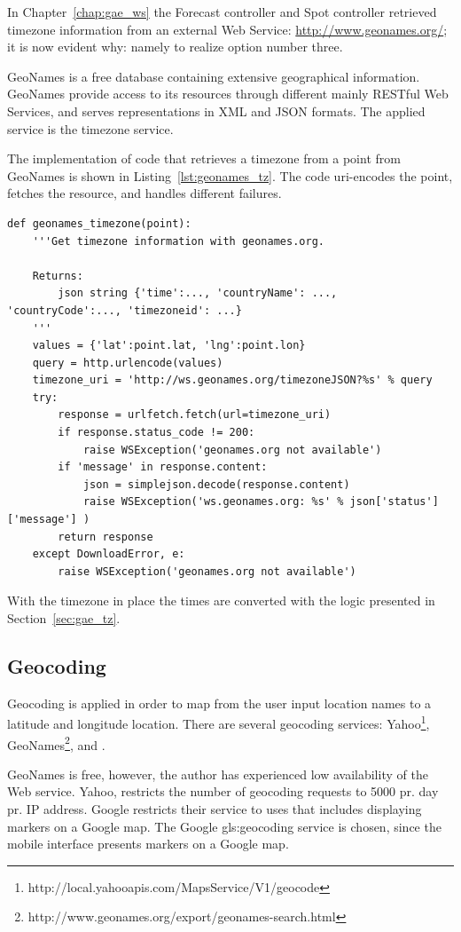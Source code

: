 In Chapter~\ref{chap:gae_ws} the Forecast controller and Spot controller
retrieved timezone information from an external Web Service:
\url{http://www.geonames.org/}; it is now evident why: namely to realize option
number three. 

GeoNames is a free database containing extensive geographical
information. GeoNames provide access to its resources through different mainly
RESTful Web Services, and serves representations in XML and JSON formats. The
applied service is the timezone service.

The implementation of code that retrieves a timezone from a point from GeoNames
is shown in Listing~\ref{lst:geonames_tz}. The code uri-encodes the point, fetches
the resource, and handles different failures.

\begin{lstlisting}[caption=Using GeoNames timezone Web Service, label=lst:geonames_tz]
def geonames_timezone(point):
    '''Get timezone information with geonames.org.
    
    Returns:
        json string {'time':..., 'countryName': ..., 'countryCode':..., 'timezoneid': ...}
    '''
    values = {'lat':point.lat, 'lng':point.lon}
    query = http.urlencode(values)
    timezone_uri = 'http://ws.geonames.org/timezoneJSON?%s' % query
    try:
        response = urlfetch.fetch(url=timezone_uri)
        if response.status_code != 200:
            raise WSException('geonames.org not available')
        if 'message' in response.content:
            json = simplejson.decode(response.content)
            raise WSException('ws.geonames.org: %s' % json['status']['message'] )
        return response
    except DownloadError, e:
        raise WSException('geonames.org not available')
\end{lstlisting}

With the timezone in place the times are converted with the logic presented in
Section~\ref{sec:gae_tz}.


\subsection{Geocoding}
Geocoding is applied in order to map from the user input location names to a
latitude and longitude location. There are several geocoding services:
Yahoo\footnote{http://local.yahooapis.com/MapsService/V1/geocode},
GeoNames\footnote{http://www.geonames.org/export/geonames-search.html}, and
\citep{google:geo}.

GeoNames is free, however, the author has experienced low availability of the Web
service. Yahoo, restricts the number of geocoding requests to 5000 pr. day pr. IP
address. Google restricts their service to uses that includes displaying markers
on a Google map. The Google \gls{gls:geocoding} service is chosen, since the mobile
interface presents markers on a Google map. 

